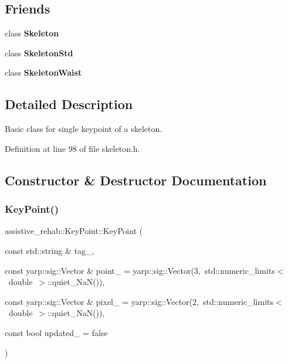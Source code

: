 \subsection*{Friends}
\begin{DoxyCompactItemize}
\item 
\mbox{\label{classassistive__rehab_1_1KeyPoint_a6a11291b70c2cbded85d321ce539c62f}} 
class {\bfseries Skeleton}
\item 
\mbox{\label{classassistive__rehab_1_1KeyPoint_ad3de273c9c6dd0dc83202526523f8dd7}} 
class {\bfseries Skeleton\+Std}
\item 
\mbox{\label{classassistive__rehab_1_1KeyPoint_a5aa4d49cfe94f8484e9b042b4e72d2c8}} 
class {\bfseries Skeleton\+Waist}
\end{DoxyCompactItemize}


\subsection{Detailed Description}
Basic class for single keypoint of a skeleton. 

Definition at line 98 of file skeleton.\+h.



\subsection{Constructor \& Destructor Documentation}
\mbox{\label{classassistive__rehab_1_1KeyPoint_ad146e6b6fe96ae4eeaa9d4fa8eaebb40}} 
\subsubsection{\texorpdfstring{KeyPoint()}{KeyPoint()}}
{\footnotesize\ttfamily assistive\+\_\+rehab\+::\+Key\+Point\+::\+Key\+Point (\begin{DoxyParamCaption}\item[{const std\+::string \&}]{tag\+\_\+,  }\item[{const yarp\+::sig\+::\+Vector \&}]{point\+\_\+ = {\ttfamily yarp\+:\+:sig\+:\+:Vector(3,~std\+:\+:numeric\+\_\+limits$<$~double~$>$\+:\+:quiet\+\_\+NaN())},  }\item[{const yarp\+::sig\+::\+Vector \&}]{pixel\+\_\+ = {\ttfamily yarp\+:\+:sig\+:\+:Vector(2,~std\+:\+:numeric\+\_\+limits$<$~double~$>$\+:\+:quiet\+\_\+NaN())},  }\item[{const bool}]{updated\+\_\+ = {\ttfamily false} }\end{DoxyParamCaption})}



